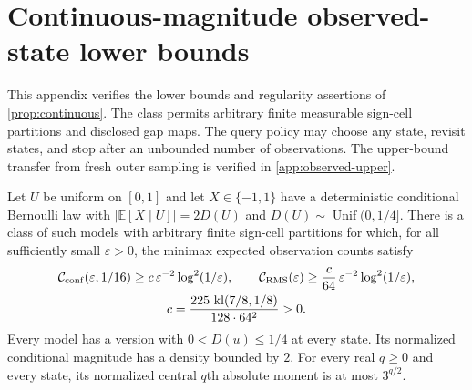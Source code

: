 \section{Continuous-magnitude observed-state lower bounds}
\label{app:continuous-observed}

This appendix verifies the lower bounds and regularity assertions of
\cref{prop:continuous}. The class permits arbitrary finite measurable
sign-cell partitions and disclosed gap maps. The query policy may choose
any state, revisit states, and stop after an unbounded number of observations.
The upper-bound transfer from fresh outer sampling is verified in \cref{app:observed-upper}.

\begin{theorem}
\label{thm:continuous-observed-verified}
Let $U$ be uniform on $[0,1]$ and let $X\in\{-1,1\}$ have a deterministic
conditional Bernoulli law with
$|\mathbb E[X\mid U]|=2D(U)$ and
$D(U)\sim\operatorname{Unif}(0,1/4]$.
There is a class of such models with arbitrary finite sign-cell
partitions for which, for all sufficiently small $\varepsilon>0$,
the minimax expected observation counts satisfy
\[
\begin{gathered}
 \mathcal C_{\rm conf}(\varepsilon,1/16)
 \ge c\,\varepsilon^{-2}\log^2(1/\varepsilon),
 \qquad
 \mathcal C_{\rm RMS}(\varepsilon)
 \ge \frac{c}{64}\,\varepsilon^{-2}\log^2(1/\varepsilon),\\
 c=\frac{225\,\operatorname{kl}(7/8,1/8)}{128\cdot64^2}>0.
\end{gathered}
\]
Every model has a version with $0<D(u)\le1/4$ at every state.
Its normalized conditional magnitude has a density bounded by $2$.
For every real $q\ge0$ and every state, its normalized central
$q$th absolute moment is at most $3^{q/2}$.
\end{theorem}

